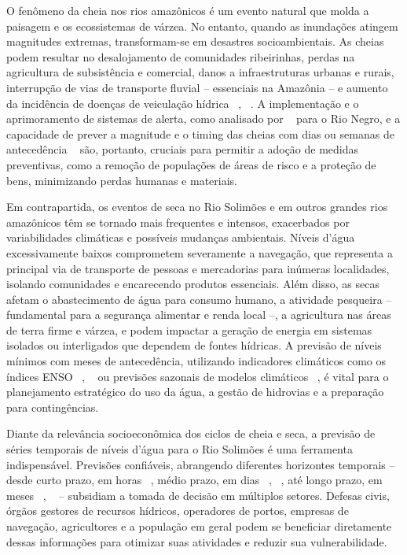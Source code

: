 \documentclass[ 12pt,a4paper ]{article} %
\begin{document}
		O fenômeno da cheia nos rios amazônicos é um evento natural que molda a paisagem e os ecossistemas de várzea. No entanto, quando as inundações atingem magnitudes extremas, transformam-se em desastres socioambientais. As cheias podem resultar no desalojamento de comunidades ribeirinhas, perdas na agricultura de subsistência e comercial, danos a infraestruturas urbanas e rurais, interrupção de vias de transporte fluvial – essenciais na Amazônia – e aumento da incidência de doenças de veiculação hídrica ~\cite{alves2022}, ~\cite{LIU2023}. A implementação e o aprimoramento de sistemas de alerta, como analisado por ~\cite{Maciel2022} para o Rio Negro, e a capacidade de prever a magnitude e o timing das cheias com dias ou semanas de antecedência ~\cite{SIQUEIRA2020} são, portanto, cruciais para permitir a adoção de medidas preventivas, como a remoção de populações de áreas de risco e a proteção de bens, minimizando perdas humanas e materiais.
		
		Em contrapartida, os eventos de seca no Rio Solimões e em outros grandes rios amazônicos têm se tornado mais frequentes e intensos, exacerbados por variabilidades climáticas e possíveis mudanças ambientais. Níveis d'água excessivamente baixos comprometem severamente a navegação, que representa a principal via de transporte de pessoas e mercadorias para inúmeras localidades, isolando comunidades e encarecendo produtos essenciais. Além disso, as secas afetam o abastecimento de água para consumo humano, a atividade pesqueira – fundamental para a segurança alimentar e renda local –, a agricultura nas áreas de terra firme e várzea, e podem impactar a geração de energia em sistemas isolados ou interligados que dependem de fontes hídricas. A previsão de níveis mínimos com meses de antecedência, utilizando indicadores climáticos como os índices ENSO ~\cite{SCHONGART2007}, ~\cite{Chevuturi2021} ou previsões sazonais de modelos climáticos ~\cite{Gubler2020}, é vital para o planejamento estratégico do uso da água, a gestão de hidrovias e a preparação para contingências.
		
		Diante da relevância socioeconômica dos ciclos de cheia e seca, a previsão de séries temporais de níveis d'água para o Rio Solimões é uma ferramenta indispensável. Previsões confiáveis, abrangendo diferentes horizontes temporais – desde curto prazo, em horas ~\cite{LIU2023}, médio prazo, em dias ~\cite{Nguyen2015}, ~\cite{Duque2022}, até longo prazo, em meses ~\cite{SCHONGART2007}, ~\cite{Gubler2020} – subsidiam a tomada de decisão em múltiplos setores. Defesas civis, órgãos gestores de recursos hídricos, operadores de portos, empresas de navegação, agricultores e a população em geral podem se beneficiar diretamente dessas informações para otimizar suas atividades e reduzir sua vulnerabilidade.
		
\end{document}
